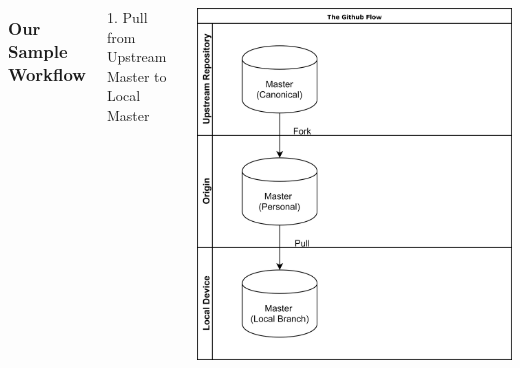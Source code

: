 \documentclass[unknownkeysallowed]{beamer}
\begin{document}
\begin{frame}
    \vspace{1cm}
	\begin{columns}
		\column{2.5in}
    \frametitle{Our Sample Workflow}
        1. Pull from Upstream Master to \\
        Local Master \linebreak\linebreak
	\linebreak\linebreak 
	\linebreak\linebreak
	\linebreak\linebreak
	\linebreak\linebreak
	\linebreak\linebreak
	\column{2.25in}
	\begin{center}
	\includegraphics[width = .9\linewidth]{assets/gitflow3}
	\end{center}
	\end{columns}
    \vspace{1cm}
\end{frame}
\end{document}
